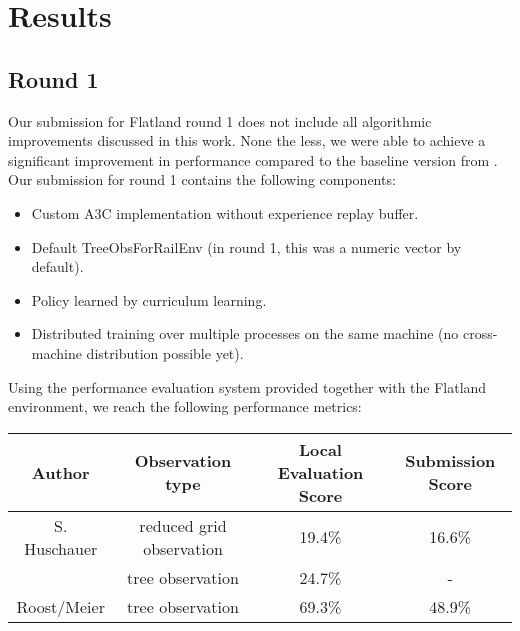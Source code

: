 %
%

\chapter{Results}\label{chap.resultate}
\section{Round 1}
Our submission for Flatland round 1 does not include all algorithmic improvements discussed in this work. None the less, we were able to achieve a significant improvement in performance compared to the baseline version from \cite{flatlandstephan}.
Our submission for round 1 contains the following components:
\begin{itemize}
	\item Custom A3C implementation without experience replay buffer.
	\item Default TreeObsForRailEnv (in round 1, this was a numeric vector by default).
	\item Policy learned by curriculum learning.
	\item Distributed training over multiple processes on the same machine (no cross-machine distribution possible yet).
\end{itemize}
Using the performance evaluation system provided together with the Flatland environment, we reach the following performance metrics:

\begin{tabular}{ |c|c|c|c| } 
	\hline
	\textbf{Author} & \textbf{Observation type} & \textbf{Local Evaluation Score} & \textbf{Submission Score} \\
	\hline
	S. Huschauer & reduced grid observation & 19.4\% & 16.6\% \\
	& tree observation & 24.7\% & - \\
	Roost/Meier & tree observation & 69.3\% & 48.9\% \\
	\hline
\end{tabular}
